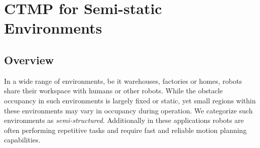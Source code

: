 \documentclass[a4paper]{report}
\begin{document}
%
%
%
%
%

\newpage
\chapter{CTMP for Semi-static Environments}
\label{chap:icra}
\section{Overview}
In a wide range of environments, be it warehouses, factories or homes, robots share their workspace with humans or other robots. While the obstacle occupancy in such environments is largely fixed or static, yet small regions within these environments may vary in occupancy during operation. We categorize such environments as \emph{semi-structured}. Additionally in these applications robots are often performing repetitive tasks and require fast and reliable motion planning capabilities.
\end{document}

